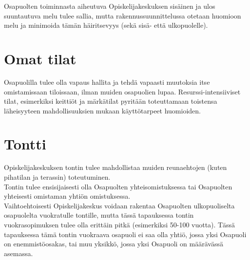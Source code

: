 \documentclass[a4paper, 12pt, finnish]{report}
\begin{document}
Osapuolten toiminnasta aiheutuva Opiskelijakeskuksen sisäinen ja ulos suuntautuva melu tulee sallia, mutta rakennussuunnittelussa otetaan huomioon melu ja minimoida tämän häiritsevyys (sekä sisä- että ulkopuolelle).


\section*{Omat tilat}
Osapuolilla tulee olla vapaus hallita ja tehdä vapaasti muutoksia itse omistamissaan tiloissaan, ilman muiden osapuolien lupaa.
Resurssi-intensiiviset tilat, esimerkiksi keittiöt ja märkätilat pyritään toteuttamaan toistensa läheisyyteen mahdollisuuksien mukaan käyttötarpeet huomioiden.


\section*{Tontti}
Opiskelijakeskuksen tontin tulee mahdollistaa muiden reunaehtojen (kuten pihatilan ja terassin) toteutuminen.\\

Tontin tulee ensisijaisesti olla Osapuolten yhteisomistuksessa tai Osapuolten yhteisesti omistaman yhtiön omistuksessa.\\

Vaihtoehtoisesti Opiskelijakeskus voidaan rakentaa Osapuolten ulkopuoliselta osapuolelta vuokratulle tontille, mutta tässä tapauksessa tontin vuokrasopimuksen tulee olla erittäin pitkä (esimerkiksi 50-100 vuotta).
Tässä tapauksessa tämä tontin vuokraava osapuoli ei saa olla yhtiö, jossa yksi Osapuoli on enemmistöosakas, tai muu yksikkö, jossa yksi Osapuoli on määrävässä asemassa.


\newpage
\end{document}
